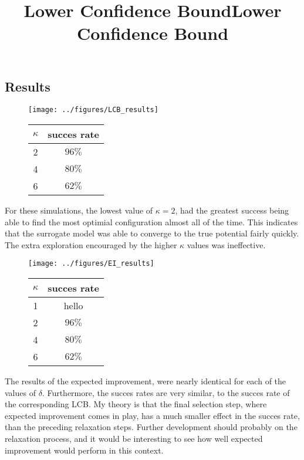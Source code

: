 \documentclass[working, oneside]{../../../Preambles/marginclass}
\begin{document}
\subsection{Results}
\begin{figure}[htpb]
    \title{Lower Confidence Bound}
    \centering
    \begin{minipage}{0.4\textwidth}
        \centering
        \texttt{[image: ../figures/LCB\_results]}
    \end{minipage}
    \begin{minipage}{0.4\textwidth}
        \centering
        \begin{tabular}{c|c}
            $\kappa$ & succes rate \\ \hline
            2 & $96\%$   \\ \hline
            4 & $80\%$   \\ \hline
            6 & $62\%$   
        \end{tabular}
    \end{minipage}
\end{figure}
\noindent
For these simulations, the lowest value of $\kappa = 2$, had the greatest success being able to find the most optimial configuration almost all of the time. This indicates that the surrogate model was able to converge to the true potential fairly quickly. The extra exploration encouraged by the higher $\kappa$ values was ineffective.
\begin{figure}[htpb]
    \title{Lower Confidence Bound}
    \centering
    \begin{minipage}{0.4\textwidth}
        \centering
        \texttt{[image: ../figures/EI\_results]}
    \end{minipage}
    \begin{minipage}{0.4\textwidth}
        \centering
        \begin{tabular}{c|c}
            $\kappa$ & succes rate \\ \hline
            1 & hello \\
            2 & $96\%$   \\ \hline
            4 & $80\%$   \\ \hline
            6 & $62\%$   
        \end{tabular}
    \end{minipage}
\end{figure}
The results of the expected improvement, were nearly identical for each of the values of $\delta$. Furthermore, the succes rates are very similar, to the succes rate of the corresponding LCB. My theory is that the final selection step, where expected improvement comes in play, has a much smaller effect in the succes rate, than the preceding relaxation steps. Further development should probably on the relaxation process, and it would be interesting to see how well expected improvement would perform in this context. 
\newpage
{}
\end{document}
